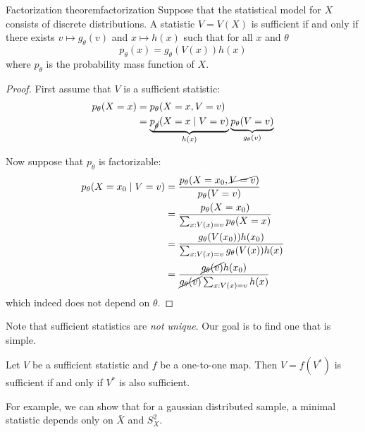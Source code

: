 \documentclass[12pt]{extarticle}
\begin{document}
\begin{theorem}{Factorization theorem}{factorization}
    Suppose that the statistical model for $X$ consists of discrete distributions.
    A statistic $V = V(X)$ is sufficient if and only if there exists $v \mapsto g_\theta(v)$ and $x \mapsto h(x)$
    such that for all $x$ and $\theta$
    \begin{equation}
        p_\theta(x) = g_\theta (V(x)) h(x)
    \end{equation}
    where $p_\theta$ is the probability mass function of $X$.
\end{theorem}

\begin{proof}
    First assume that $V$ is a sufficient statistic:
    \begin{align}
        p_\theta(X = x) & = p_\theta(X = x, V = v)                                                                               \\
                        & = \underbrace{p_{\cancel{\theta}}(X = x \mid V = v)}_{h(x)} \underbrace{p_\theta(V = v)}_{g_\theta(v)}
    \end{align}

    Now suppose that $p_\theta$ is factorizable:
    \begin{align}
        p_\theta(X = x_0 \mid V = v) & = \frac{p_\theta(X = x_0, \cancel{V = v})}{p_\theta(V = v)}                        \\
                                     & = \frac{p_\theta (X = x_0)}{\sum_{x: V(x) = v} p_\theta (X = x)}                   \\
                                     & = \frac{g_\theta(V(x_0)) h(x_0)}{\sum_{x: V(x) = v} g_\theta(V(x)) h(x)}           \\
                                     & = \frac{\cancel{g_\theta(v)} h(x_0)}{\cancel{g_\theta(v)} \sum_{x: V(x) = v} h(x)}
    \end{align}
    which indeed does not depend on $\theta$.
\end{proof}

Note that sufficient statistics are \emph{not unique}.
Our goal is to find one that is simple.

\begin{lemma}{}{}
    Let $V$ be a sufficient statistic and $f$ be a one-to-one map.
    Then $V = f(V^*)$ is sufficient if and only if $V^*$ is also sufficient.
\end{lemma}

For example, we can show that for a gaussian distributed sample,
a minimal statistic depends only on $\bar X$ and $S_X^2$.
\end{document}
